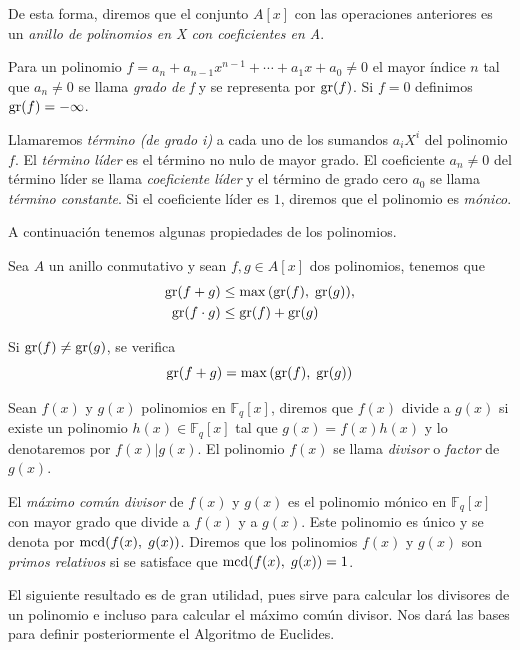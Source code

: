 De esta forma, diremos que el conjunto $A[x]$ con las operaciones anteriores es un \emph{anillo de polinomios en X con coeficientes en A}.

\begin{definition}
    Para un polinomio $f = a_n + a_{n-1} x^{n-1} + \cdots + a_1 x + a_0 \neq 0$ el mayor índice $n$ tal que $a_n \neq 0$ se llama \emph{grado de f} y se representa por $\operatorname{gr}(f)$. Si $f = 0$ definimos $\operatorname{gr}(f) = - \infty$.

    Llamaremos \emph{término (de grado i)} a cada uno de los sumandos $a_i X^i$ del polinomio $f$. El \emph{término líder} es el término no nulo de mayor grado. El coeficiente $a_n \neq 0$ del término líder se llama \emph{coeficiente líder} y el término de grado cero $a_0$ se llama \emph{término constante}. Si el coeficiente líder es $1$, diremos que el polinomio es \emph{mónico}.
\end{definition}

A continuación tenemos algunas propiedades de los polinomios.

\begin{proposition}
    Sea $A$ un anillo conmutativo y sean $f,g \in A[x]$ dos polinomios, tenemos que 
    \begin{align*}
        \operatorname{gr}(f + g) &\leq \max{(\operatorname{gr}(f), \; \operatorname{gr}(g))},\\
        \operatorname{gr}(f \cdot g) &\leq \operatorname{gr}(f) + \operatorname{gr}(g)
    \end{align*}

    Si $\operatorname{gr}(f) \neq \operatorname{gr}(g)$, se verifica
    \[
        \operatorname{gr}(f + g) = \max{(\operatorname{gr}(f), \; \operatorname{gr}(g))}
    \]
\end{proposition}

Sean $f(x)$ y $g(x)$ polinomios en $\mathbb{F}_q[x]$, diremos que $f(x)$ divide a $g(x)$ si existe un polinomio $h(x) \in \mathbb{F}_q[x]$ tal que $g(x) = f(x) h(x)$ y lo denotaremos por $f(x) \vert g(x)$. El polinomio $f(x)$ se llama \emph{divisor} o \emph{factor} de $g(x)$.

El \emph{máximo común divisor} de $f(x)$ y $g(x)$ es el polinomio mónico en $\mathbb{F}_q[x]$ con mayor grado que divide a $f(x)$ y a $g(x)$. Este polinomio es único y se denota por $\operatorname{mcd}(f(x), \; g(x))$. Diremos que los polinomios $f(x)$ y $g(x)$ son \emph{primos relativos} si se satisface que $\operatorname{mcd}(f(x), \; g(x)) = 1$.

El siguiente resultado es de gran utilidad, pues sirve para calcular los divisores de un polinomio e incluso para calcular el máximo común divisor. Nos dará las bases para definir posteriormente el Algoritmo de Euclides.

